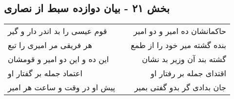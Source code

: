 \begin{center}
\section*{بخش ۲۱ - بیان دوازده سبط از نصاری}
\label{sec:sh021}
\begin{longtable}{l p{0.5cm} r}
قوم عیسی را بد اندر دار و گیر
&&
حاکمانشان ده امیر و دو امیر
\\
هر فریقی مر امیری را تبع
&&
بنده گشته میر خود را از طمع
\\
این ده و این دو امیر و قومشان
&&
گشته بند آن وزیر بد نشان
\\
اعتماد جمله بر گفتار او
&&
اقتدای جمله بر رفتار او
\\
پیش او در وقت و ساعت هر امیر
&&
جان بدادی گر بدو گفتی بمیر
\\
\end{longtable}
\end{center}
